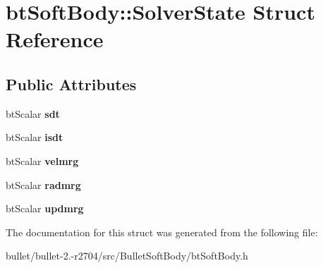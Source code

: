 \hypertarget{structbt_soft_body_1_1_solver_state}{\section{bt\+Soft\+Body\+:\+:Solver\+State Struct Reference}
\label{structbt_soft_body_1_1_solver_state}
}
\subsection*{Public Attributes}
\begin{DoxyCompactItemize}
\item 
\hypertarget{structbt_soft_body_1_1_solver_state_ad0ea3088c28d3c1ca19022b7208fe1d8}{bt\+Scalar {\bfseries sdt}}\label{structbt_soft_body_1_1_solver_state_ad0ea3088c28d3c1ca19022b7208fe1d8}

\item 
\hypertarget{structbt_soft_body_1_1_solver_state_a9e8fa89d8f7a168de0dedb36d59945bc}{bt\+Scalar {\bfseries isdt}}\label{structbt_soft_body_1_1_solver_state_a9e8fa89d8f7a168de0dedb36d59945bc}

\item 
\hypertarget{structbt_soft_body_1_1_solver_state_a1c69b78153f16112307397d1df33d67a}{bt\+Scalar {\bfseries velmrg}}\label{structbt_soft_body_1_1_solver_state_a1c69b78153f16112307397d1df33d67a}

\item 
\hypertarget{structbt_soft_body_1_1_solver_state_a2cfb8275eeb89b28d79bd63111b3896d}{bt\+Scalar {\bfseries radmrg}}\label{structbt_soft_body_1_1_solver_state_a2cfb8275eeb89b28d79bd63111b3896d}

\item 
\hypertarget{structbt_soft_body_1_1_solver_state_a9c0af9368af8da8dfe7b94bd9d7542f0}{bt\+Scalar {\bfseries updmrg}}\label{structbt_soft_body_1_1_solver_state_a9c0af9368af8da8dfe7b94bd9d7542f0}

\end{DoxyCompactItemize}


The documentation for this struct was generated from the following file\+:\begin{DoxyCompactItemize}
\item 
bullet/bullet-\/2.-\/r2704/src/\+Bullet\+Soft\+Body/bt\+Soft\+Body.\+h\end{DoxyCompactItemize}
